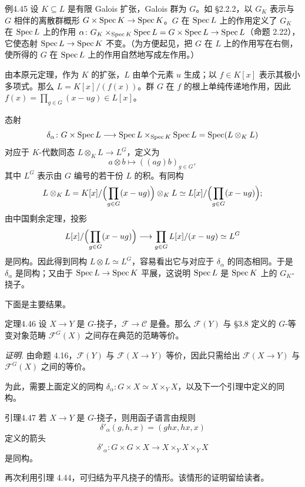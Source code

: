 \begin{origstatement}{例}{4.45}\label{ch04:ex445}
设 $K\subseteq L$ 是有限 Galois 扩张，Galois 群为 $G$。如 §2.2.2，以 $G_K$ 表示与 $G$ 相伴的离散群概形 $G\times\operatorname{Spec} K\to\operatorname{Spec} K$。$G$ 在 $\operatorname{Spec} L$ 上的作用定义了 $G_K$ 在 $\operatorname{Spec} L$ 上的作用
$\alpha\colon G_K\times_{\operatorname{Spec} K}\operatorname{Spec} L=G\times\operatorname{Spec} L\to\operatorname{Spec} L$（命题 2.22），它使态射 $\operatorname{Spec} L\to\operatorname{Spec} K$ 不变。（为方便起见，把 $G$ 在 $L$ 上的作用写在右侧，使所得的 $G$ 在 $\operatorname{Spec} L$ 上的作用自然地写成左作用。）

由本原元定理，作为 $K$ 的扩张，$L$ 由单个元素 $u$ 生成；以 $f\in K[x]$ 表示其极小多项式。那么 $L=K[x]/(f(x))$。群 $G$ 在 $f$ 的根上单纯传递地作用，因此 $f(x)=\prod_{g\in G}(x-ug)\in L[x]$。

态射
\[
 \delta_\alpha\colon G\times\operatorname{Spec} L\longrightarrow
 \operatorname{Spec} L\times_{\operatorname{Spec} K}\operatorname{Spec} L=\operatorname{Spec}(L\otimes_K L)
\]
对应于 $K$-代数同态 $L\otimes_K L\to L^G$，定义为
\[
 a\otimes b\longmapsto((ag)b)_{g\in G},
\]
其中 $L^G$ 表示由 $G$ 编号的若干份 $L$ 的积。有同构
\[
 L\otimes_K L=K[x]/\Bigl(\prod_{g\in G}(x-ug)\Bigr)\otimes_K L
 \simeq L[x]/\Bigl(\prod_{g\in G}(x-ug)\Bigr);
\]
由中国剩余定理，投影
\[
 L[x]/\Bigl(\prod_{g\in G}(x-ug)\Bigr)
 \longrightarrow\prod_{g\in G}L[x]/(x-ug)\simeq L^G
\]
是同构。因此得到同构 $L\otimes L\simeq L^G$，容易看出它与对应于 $\delta_\alpha$ 的同态相同。于是 $\delta_\alpha$ 是同构；又由于 $\operatorname{Spec} L\to\operatorname{Spec} K$ 平展，这说明 $\operatorname{Spec} L$ 是 $\operatorname{Spec} K$ 上的 $G_K$-挠子。
\end{origstatement}

下面是主要结果。

\begin{origstatement}{定理}{4.46}\label{ch04:thm446}
设 $X\to Y$ 是 $G$-挠子，$\mathcal F\to\mathcal C$ 是叠。那么 $\mathcal F(Y)$ 与 §3.8 定义的 $G$-等变对象范畴 $\mathcal F^G(X)$ 之间存在典范的范畴等价。
\end{origstatement}
\noindent\textit{证明.}
由命题 4.16，$\mathcal F(Y)$ 与 $\mathcal F(X\to Y)$ 等价，因此只需给出 $\mathcal F(X\to Y)$ 与 $\mathcal F^G(X)$ 之间的等价。

为此，需要上面定义的同构 $\delta_\alpha\colon G\times X\simeq X\times_Y X$，以及下一个引理中定义的同构。

\begin{origstatement}{引理}{4.47}\label{ch04:lem447}
若 $X\to Y$ 是 $G$-挠子，则用函子语言由规则
\[
 \delta'_\alpha(g,h,x)=(ghx,hx,x)
\]
定义的箭头
\[
 \delta'_\alpha\colon G\times G\times X\longrightarrow X\times_Y X\times_Y X
\]
是同构。
\end{origstatement}
再次利用引理 4.44，可归结为平凡挠子的情形。该情形的证明留给读者。

